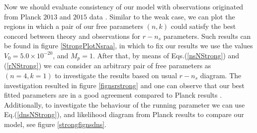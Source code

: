 \documentclass[12pt]{revtex4}
\begin{document}
Now we  should evaluate consistency of our model with observations  originated from Planck $2013$ and $2015$ data \cite{Ade:2013ktc,Ade:2013uln,Planck2015}. Similar to the weak case, we can plot the regions in which a pair of our free parameters $(n, k) $  could satisfy the best concord between theory and observations for $r-n_s$ parameters. Such results can be found in figure \ref{StrongPlotNsraa}, in which to fix our results we use the values $V_0=5.0\times10^{-20}$, and $M_p=1$. {After that, } by means of Eqs.(\ref{nsNStrong}) and (\ref{rNStrong}) we can consider an arbitrary pair of free parameters as $(n=4, k=1)$ to investigate the results based on usual $r-n_s$ diagram. The investigation resulted in figure \ref{fignsrstrong} and one can observe that our best fitted parameters are in a good agreement compared to Planck results  \cite{Planck2015}. Additionally, to investigate the behaviour of the running parameter we can use Eq.(\ref{dnsNStrong}), and likelihood diagram from Planck results to compare our model, see figure \ref{strongfignsdns}.
\end{document}
